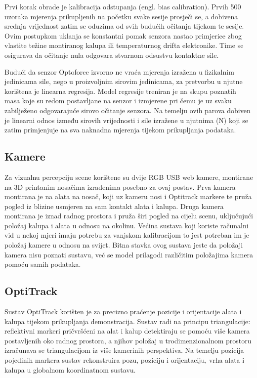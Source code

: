\documentclass[times, utf8, diplomski]{fer}
\begin{document}
Prvi korak obrade je kalibracija odstupanja (engl. bias calibration). Prvih 500 uzoraka mjerenja prikupljenih na početku svake sesije prosječi se, a dobivena srednja vrijednost zatim se oduzima od svih budućih očitanja tijekom te sesije. Ovim postupkom uklanja se konstantni pomak senzora nastao primjerice zbog vlastite težine montiranog kalupa ili temperaturnog drifta elektronike. Time se osigurava da očitanje nula odgovara stvarnom odsustvu kontaktne sile.

Budući da senzor Optoforce izvorno ne vraća mjerenja izražena u fizikalnim jedinicama sile, nego u proizvoljnim sirovim jedinicama, za pretvorbu u njutne korištena je linearna regresija. Model regresije treniran je na skupu poznatih masa koje su redom postavljane na senzor i izmjerene pri čemu je uz svaku zabilježeno odgovarajuće sirovo očitanje senzora. Na temelju ovih parova dobiven je linearni odnos između sirovih vrijednosti i sile izražene u njutnima (N) koji se zatim primjenjuje na sva naknadna mjerenja tijekom prikupljanja podataka.

\subsection{Kamere}

Za vizualnu percepciju scene korištene su dvije RGB USB web kamere, montirane na 3D printanim nosačima izrađenima posebno za ovaj postav. Prva kamera montirana je na alata na nosač, koji uz kameru nosi i Optitrack markere te pruža pogled iz blizine usmjeren na sam kontakt alata i kalupa. Druga kamera montirana je iznad radnog prostora i pruža širi pogled na cijelu scenu, uključujući položaj kalupa i alata u odnosu na okolinu. Većina sustava koji koriste računalni vid u nekoj mjeri imaju potrebu za vanjskom kalibracijom to jest potreban im je položaj kamere u odnosu na svijet. Bitna stavka ovog sustava jeste da položaji kamera nisu poznati sustavu, već se model prilagodi različitim položajima kamera pomoću samih podataka.

\subsection{OptiTrack}

Sustav OptiTrack korišten je za precizno praćenje pozicije i orijentacije alata i kalupa tijekom prikupljanja demonstracija. Sustav radi na principu triangulacije: reflektivni markeri pričvršćeni na alat i kalup detektiraju se pomoću više kamera postavljenih oko radnog prostora, a njihov položaj u trodimenzionalnom prostoru izračunava se triangulacijom iz više kamerinih perspektiva. Na temelju pozicija pojedinih markera sustav rekonstruira pozu, poziciju i orijentaciju, vrha alata i kalupa u globalnom koordinatnom sustavu.
\end{document}
